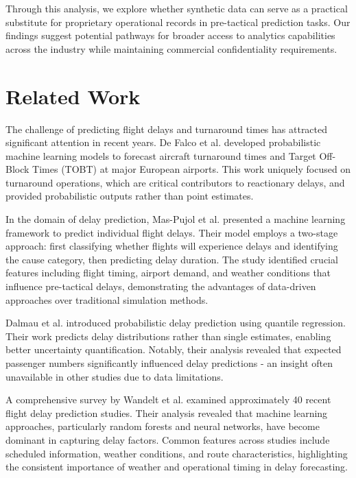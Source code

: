 \documentclass[conference]{IEEEtran}
\begin{document}
Through this analysis, we explore whether synthetic data can serve as a practical substitute for proprietary operational records in pre-tactical prediction tasks. Our findings suggest potential pathways for broader access to analytics capabilities across the industry while maintaining commercial confidentiality requirements.

\section{Related Work}

The challenge of predicting flight delays and turnaround times has attracted significant attention in recent years. De Falco et al. \cite{de2023probabilistic} developed probabilistic machine learning models to forecast aircraft turnaround times and Target Off-Block Times (TOBT) at major European airports. This work uniquely focused on turnaround operations, which are critical contributors to reactionary delays, and provided probabilistic outputs rather than point estimates.

In the domain of delay prediction, Mas-Pujol et al. \cite{mas2022pre} presented a machine learning framework to predict individual flight delays. Their model employs a two-stage approach: first classifying whether flights will experience delays and identifying the cause category, then predicting delay duration. The study identified crucial features including flight timing, airport demand, and weather conditions that influence pre-tactical delays, demonstrating the advantages of data-driven approaches over traditional simulation methods.

Dalmau et al. \cite{dalmau2024probabilistic} introduced probabilistic delay prediction using quantile regression. Their work predicts delay distributions rather than single estimates, enabling better uncertainty quantification. Notably, their analysis revealed that expected passenger numbers significantly influenced delay predictions - an insight often unavailable in other studies due to data limitations.

A comprehensive survey by Wandelt et al. \cite{wandelt2025flight}  examined approximately 40 recent flight delay prediction studies. Their analysis revealed that machine learning approaches, particularly random forests and neural networks, have become dominant in capturing delay factors. Common features across studies include scheduled information, weather conditions, and route characteristics, highlighting the consistent importance of weather and operational timing in delay forecasting.
\end{document}
